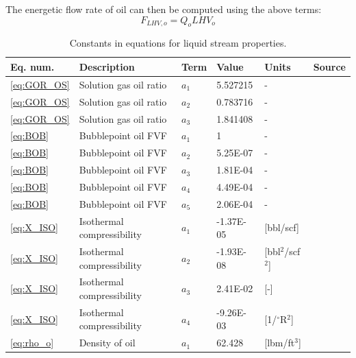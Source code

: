 \documentclass[11pt]{report}
\begin{document}
The energetic flow rate of oil can then be computed using the above terms:
\begin{equation}
F_{LHV,o} = Q_o  LHV_o
\end{equation}




\begin{table}
\begin{scriptsize}
\caption{Constants in equations for liquid stream properties.}
\label{tab:ConstantsLiquidFlowSheet}
\begin{tabularx}{1\columnwidth}{p{}p{}p{}p{}p{}p{}}
\toprule
Eq. num. 			& Description	 			& Term		& Value  		& Units		& Source \\
\midrule
\ref{eq:GOR_OS}	& Solution gas oil ratio		& $a_1$		& 5.527215	& -			& \cite{Alshammasi2001} \\
\ref{eq:GOR_OS}	& Solution gas oil ratio		& $a_2$		& 0.783716	& -			& \cite{Alshammasi2001} \\
\ref{eq:GOR_OS}	& Solution gas oil ratio		& $a_3$		& 1.841408	& -			& \cite{Alshammasi2001} \\
\midrule
\ref{eq:BOB}		& Bubblepoint oil FVF		& $a_1$		& 1			& -			& \cite{Alshammasi2001} \\
\ref{eq:BOB}		& Bubblepoint oil FVF		& $a_2$		& 5.25E-07	& -			& \cite{Alshammasi2001} \\
\ref{eq:BOB}		& Bubblepoint oil FVF		& $a_3$		& 1.81E-04	& -			& \cite{Alshammasi2001} \\
\ref{eq:BOB}		& Bubblepoint oil FVF		& $a_4$		& 4.49E-04	& -			& \cite{Alshammasi2001} \\
\ref{eq:BOB}		& Bubblepoint oil FVF		& $a_5$		& 2.06E-04	& -			& \cite{Alshammasi2001} \\
\midrule
\ref{eq:X_ISO}		& Isothermal compressibility	& $a_1$		& -1.37E-05	& [bbl/scf]			& \cite{Almarhoun1992} \\
\ref{eq:X_ISO}		& Isothermal compressibility	& $a_2$		& -1.93E-08	& [bbl$^2$/scf$^2$]			& \cite{Almarhoun1992} \\
\ref{eq:X_ISO}		& Isothermal compressibility	& $a_3$		& 2.41E-02	& [-]			& \cite{Almarhoun1992} \\
\ref{eq:X_ISO}		& Isothermal compressibility	& $a_4$		& -9.26E-03	& [1/$^\circ$R$^2$]			& \cite{Almarhoun1992} \\
\midrule
\ref{eq:rho_o}		& Density of oil				& $a_1$		& 62.428		& [lbm/ft$^3$]			& \cite{Fanchi2007} \\

\end{tabularx}
\end{scriptsize}
\end{table}
\end{document}
